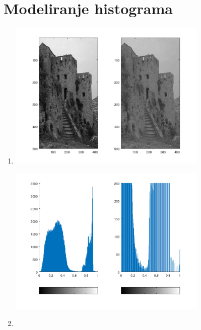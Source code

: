 \documentclass[12pt, a4]{report}
\begin{document}
        \section{Modeliranje histograma}
            \begin{enumerate}
                \item
                    \begin{minipage}{\linewidth}
                        \centering
                        \includegraphics[width=0.75\textwidth]{klis_model}
                    \end{minipage}
                    \begin{minipage}{\linewidth}
                        \centering
                        \includegraphics[width=0.75\textwidth]{klis_model_hist}
                    \end{minipage}
                \item    
                    \begin{minipage}{\linewidth}

\end{minipage}
\end{enumerate}
\end{document}
